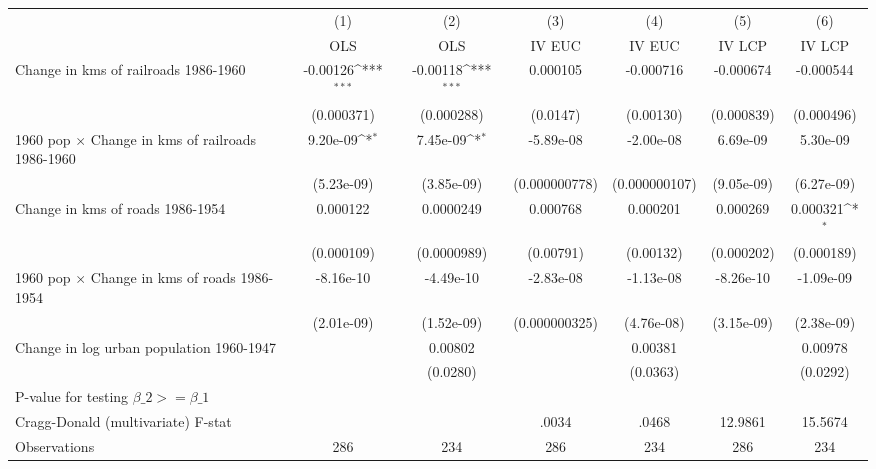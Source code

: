 {
\def\sym#1{\ifmmode^{#1}\else\(^{#1}\)\fi}
\begin{tabular}{l*{6}{c}}
\hline\hline
                &\multicolumn{1}{c}{(1)}&\multicolumn{1}{c}{(2)}&\multicolumn{1}{c}{(3)}&\multicolumn{1}{c}{(4)}&\multicolumn{1}{c}{(5)}&\multicolumn{1}{c}{(6)}\\
                &\multicolumn{1}{c}{OLS}&\multicolumn{1}{c}{OLS}&\multicolumn{1}{c}{IV EUC}&\multicolumn{1}{c}{IV EUC}&\multicolumn{1}{c}{IV LCP}&\multicolumn{1}{c}{IV LCP}\\
\hline
Change in kms of railroads 1986-1960& -0.00126\sym{***}& -0.00118\sym{***}& 0.000105         &-0.000716         &-0.000674         &-0.000544         \\
                &(0.000371)         &(0.000288)         & (0.0147)         &(0.00130)         &(0.000839)         &(0.000496)         \\
[1em]
1960 pop $\times$ Change in kms of railroads 1986-1960& 9.20e-09\sym{*}  & 7.45e-09\sym{*}  &-5.89e-08         &-2.00e-08         & 6.69e-09         & 5.30e-09         \\
                &(5.23e-09)         &(3.85e-09)         &(0.000000778)         &(0.000000107)         &(9.05e-09)         &(6.27e-09)         \\
[1em]
Change in kms of roads 1986-1954& 0.000122         &0.0000249         & 0.000768         & 0.000201         & 0.000269         & 0.000321\sym{*}  \\
                &(0.000109)         &(0.0000989)         &(0.00791)         &(0.00132)         &(0.000202)         &(0.000189)         \\
[1em]
1960 pop $\times$ Change in kms of roads 1986-1954&-8.16e-10         &-4.49e-10         &-2.83e-08         &-1.13e-08         &-8.26e-10         &-1.09e-09         \\
                &(2.01e-09)         &(1.52e-09)         &(0.000000325)         &(4.76e-08)         &(3.15e-09)         &(2.38e-09)         \\
[1em]
Change in log urban population 1960-1947&                  &  0.00802         &                  &  0.00381         &                  &  0.00978         \\
                &                  & (0.0280)         &                  & (0.0363)         &                  & (0.0292)         \\
\hline
P-value for testing $\beta\_{2} >= \beta\_{1}$&                  &                  &                  &                  &                  &                  \\
Cragg-Donald (multivariate) F-stat&                  &                  &    .0034         &    .0468         &  12.9861         &  15.5674         \\
Observations    &      286         &      234         &      286         &      234         &      286         &      234         \\
\hline\hline
\end{tabular}
}
